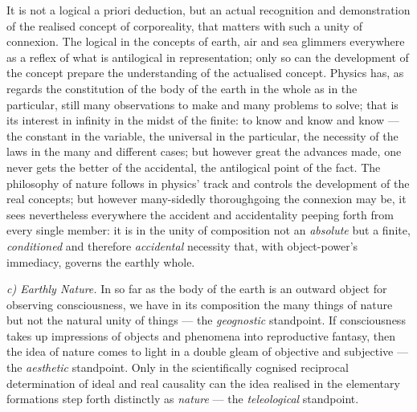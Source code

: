 \documentclass[12pt,a4paper]{book}
\newcommand{\runin}[1]{\emph{#1}\hspace{0.4em}}
\begin{document}
It is not a logical a priori deduction, but an actual recognition and demonstration of the realised concept of
corporeality, that matters with such a unity of connexion. The logical in the concepts of earth, air and sea glimmers
everywhere as a reflex of what is antilogical in representation; only so can the development of the concept prepare the
understanding of the actualised concept. Physics has, as regards the constitution of the body of the earth in the whole
as in the particular, still many observations to make and many problems to solve; that is its interest in infinity in
the midst of the finite: to know and know and know --- the constant in the variable, the universal in the particular, the
necessity of the laws in the many and different cases; but however great the advances made, one never gets the better of
the accidental, the antilogical point of the fact. The philosophy of nature follows in physics' track and controls the
development of the real concepts; but however many-sidedly thoroughgoing the connexion may be, it sees nevertheless
everywhere the accident and accidentality peeping forth from every single member: it is in the unity of composition not
an \emph{absolute} but a finite, \emph{conditioned} and therefore \emph{accidental} necessity that, with object-power's
immediacy, governs the earthly whole.

\runin{c) Earthly Nature.} In so far as the body of the earth is an outward object for observing consciousness, we have
in its composition the many things of nature but not the natural unity of things --- the \emph{geognostic} standpoint. If
consciousness takes up impressions of objects and phenomena into reproductive fantasy, then the idea of nature comes to
light in a double gleam of objective and subjective --- the \emph{aesthetic} standpoint. Only in the scientifically
cognised reciprocal determination of ideal and real causality can the idea realised in the elementary formations step
forth distinctly as \emph{nature} --- the \emph{teleological} standpoint.
\end{document}
